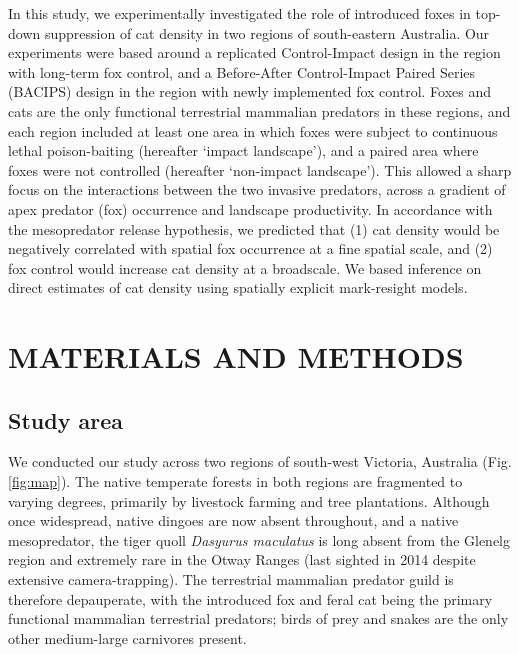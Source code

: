\documentclass[]{elsarticle} %
\begin{document}
In this study, we experimentally investigated the role of introduced foxes in top-down suppression of cat density in two regions of south-eastern Australia. Our experiments were based around a replicated Control-Impact design in the region with long-term fox control, and a Before-After Control-Impact Paired Series (BACIPS) design in the region with newly implemented fox control. Foxes and cats are the only functional terrestrial mammalian predators in these regions, and each region included at least one area in which foxes were subject to continuous lethal poison-baiting (hereafter `impact landscape'), and a paired area where foxes were not controlled (hereafter `non-impact landscape'). This allowed a sharp focus on the interactions between the two invasive predators, across a gradient of apex predator (fox) occurrence and landscape productivity. In accordance with the mesopredator release hypothesis, we predicted that (1) cat density would be negatively correlated with spatial fox occurrence at a fine spatial scale, and (2) fox control would increase cat density at a broadscale. We based inference on direct estimates of cat density using spatially explicit mark-resight models.

\newpage

\hypertarget{materials-and-methods}{%
\section{MATERIALS AND METHODS}\label{materials-and-methods}}

\hypertarget{study-area}{%
\subsection{Study area}\label{study-area}}

We conducted our study across two regions of south-west Victoria, Australia (Fig. \ref{fig:map}). The native temperate forests in both regions are fragmented to varying degrees, primarily by livestock farming and tree plantations. Although once widespread, native dingoes are now absent throughout, and a native mesopredator, the tiger quoll \emph{Dasyurus maculatus} is long absent from the Glenelg region and extremely rare in the Otway Ranges (last sighted in 2014 despite extensive camera-trapping). The terrestrial mammalian predator guild is therefore depauperate, with the introduced fox and feral cat being the primary functional mammalian terrestrial predators; birds of prey and snakes are the only other medium-large carnivores present.
\end{document}
